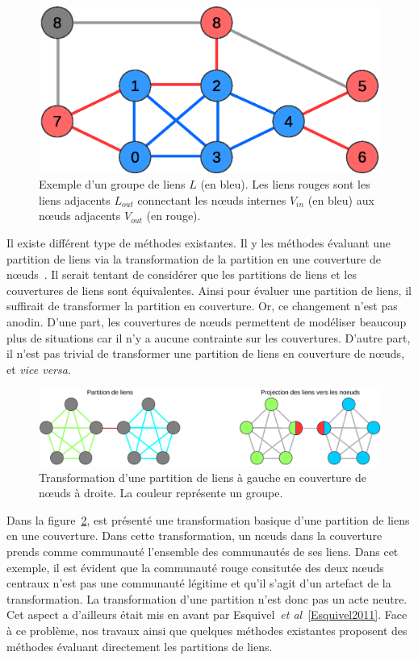 \begin{figure}
\centering
\includegraphics[width=0.4\linewidth]{img/ExpectedNodes/exemple2}
\caption{Exemple d'un groupe de liens $L$ (en \textcolor{semilightblue}{bleu}). Les liens \textcolor{pinkyred}{rouges} sont les liens adjacents $L_{out}$ connectant les n\oe uds internes $V_{in}$ (en \textcolor{semilightblue}{bleu}) aux n\oe uds adjacents $V_{out}$ (en  \textcolor{pinkyred}{rouge}).}
\label{fig:example_def_expected}
\end{figure}

Il existe différent type de méthodes existantes.
Il y les méthodes évaluant une partition de liens via la transformation de la partition en une couverture de n\oe uds~\cite{Huang2013,Lim2014,Wu2010a}.
Il serait tentant de considérer que les partitions de liens et les couvertures de liens sont équivalentes.
Ainsi pour évaluer une partition de liens, il suffirait de transformer la partition en couverture.
Or, ce changement n'est pas anodin.
D'une part, les couvertures de n\oe uds permettent de modéliser beaucoup plus de situations car il n'y a aucune contrainte sur les couvertures.
D'autre part, il n'est pas trivial de transformer une partition de liens en couverture de n\oe uds, et \emph{vice versa}.

\begin{figure}
\centering
\includegraphics[width=0.9\linewidth]{img/ExpectedNodes/Partition_Couverture}
\caption{Transformation d'une partition de liens à gauche en couverture de n\oe uds à droite. La couleur représente un groupe.}
\label{fig:Partition_Couverture}
\end{figure}

Dans la figure~\ref{fig:Partition_Couverture}, est présenté une transformation basique d'une partition de liens en une couverture.
Dans cette transformation, un n\oe uds dans la couverture prends comme communauté l'ensemble des communautés de ses liens.
Dans cet exemple, il est évident que la communauté rouge consitutée des deux n\oe uds centraux n'est pas une communauté légitime et qu'il s'agit d'un artefact de la transformation.
La transformation d'une partition n'est donc pas un acte neutre.
Cet aspect a d'ailleurs était mis en avant par Esquivel~\emph{et al}~\ref{Esquivel2011}.
Face à ce problème, nos travaux ainsi que quelques méthodes existantes proposent des méthodes évaluant directement les partitions de liens.

